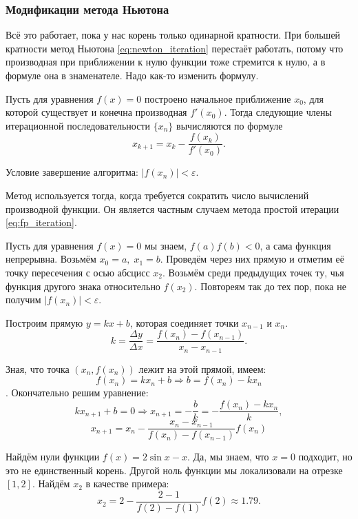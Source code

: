 \documentclass[../main.tex]{subfile}
\begin{document}
\newpage
\subsubsection{Модификации метода Ньютона}

Всё это работает, пока у нас корень только одинарной кратности. При большей
кратности метод Ньютона \eqref{eq:newton_iteration} перестаёт работать, потому
что производная при приближении к нулю функции тоже стремится к нулю, а в
формуле она в знаменателе. Надо как-то изменить формулу.

\begin{algorithm}
	Пусть для уравнения $f(x)=0$ построено начальное приближение $x_0$, для
	которой существует и конечна производная $f'(x_0)$. Тогда следующие
	члены итерационной последовательности $\{x_n\}$ вычисляются по формуле
	\[\boxed{x_{k+1}=x_k-\frac{f(x_k)}{f'(x_0)}}.\]

	Условие завершение алгоритма: $|f(x_n)|<\varepsilon$.

	Метод используется тогда, когда требуется сократить число вычислений
	производной функции. Он является частным случаем метода простой
	итерации \eqref{eq:fp_iteration}.
\end{algorithm}

\begin{algorithm}
	Пусть для уравнения $f(x)=0$ мы знаем, $f(a)f(b)<0$, а сама функция
	непрерывна. Возьмём $x_0=a,\;x_1=b$. Проведём через них прямую и отметим
	её точку пересечения с осью абсцисс $x_2$. Возьмём среди предыдущих
	точек ту, чья функция другого знака относительно $f(x_2)$. Повтореям так
	до тех пор, пока не получим $|f(x_n)|<\varepsilon$.

	Построим прямую $y=kx+b$, которая соединяет точки $x_{n-1}$ и $x_n$.
	\[k=\frac{\Delta y}{\Delta x}=\frac{f(x_n)-f(x_{n-1})}{x_n-x_{n-1}}.\]

	Зная, что точка $(x_n,f(x_n))$ лежит на этой прямой, имеем:
	\[f(x_n)=kx_n+b\Rightarrow b=f(x_n)-kx_n\].
	Окончательно решим уравнение:
	\[kx_{n+1}+b=0\Rightarrow x_{n+1}=-\frac{b}{k}=-\frac{f(x_n)-kx_n}{k},\]
	\[\boxed{x_{n+1}=x_n-\frac{x_n-x_{n-1}}{f(x_n)-f(x_{n-1})}f(x_n)}\]
\end{algorithm}

\begin{example}
	Найдём нули функции $f(x)=2\sin x-x$. Да, мы знаем, что $x=0$ подходит,
	но это не единственный корень. Другой ноль функции мы локализовали на
	отрезке $[1,2]$. Найдём $x_2$ в качестве примера:
	\[x_2=2-\frac{2-1}{f(2)-f(1)}f(2)\approx 1.79.\]

	
\end{example}
\end{document}
